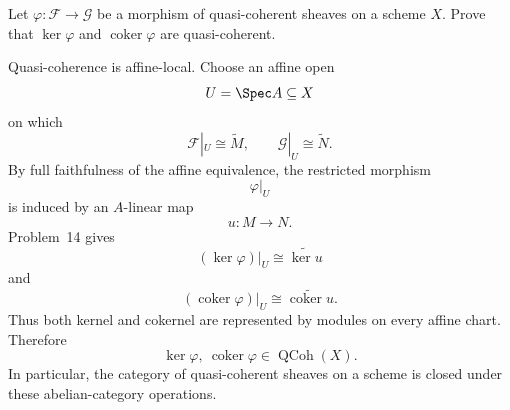 \begin{problem}\label{prob:vi33-15}
Let \(\varphi:\mathcal F\to\mathcal G\) be a morphism of quasi-coherent sheaves on a scheme \(X\). Prove that
\(\ker\varphi\) and \(\operatorname{coker}\varphi\) are quasi-coherent.

\end{problem}

\ifdefined\FullProblemDossiers
\begin{solution}
Quasi-coherence is affine-local. Choose an affine open
\[
U=\Spec A\subseteq X
\]
on which
\[
\mathcal F|_U\cong\widetilde M,
\qquad
\mathcal G|_U\cong\widetilde N.
\]
By full faithfulness of the affine equivalence, the restricted morphism
\[
\varphi|_U
\]
is induced by an \(A\)-linear map
\[
u:M\to N.
\]
Problem~14 gives
\[
(\ker\varphi)|_U
\cong
\widetilde{\ker u}
\]
and
\[
(\operatorname{coker}\varphi)|_U
\cong
\widetilde{\operatorname{coker}u}.
\]
Thus both kernel and cokernel are represented by modules on every affine chart. Therefore
\[
\boxed{
\ker\varphi,\ \operatorname{coker}\varphi\in\operatorname{QCoh}(X).
}
\]
In particular, the category of quasi-coherent sheaves on a scheme is closed under these abelian-category operations.
\end{solution}
\fi
